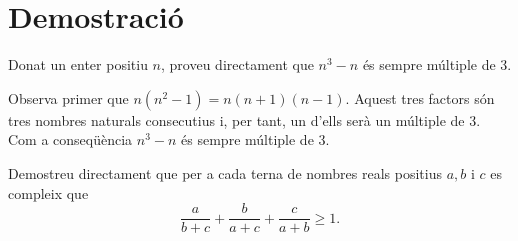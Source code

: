 \section{Demostraci\'{o}}

\begin{exer}
Donat un enter positiu $n$, proveu directament que $n^{3}-n$ \'{e}s sempre
m\'{u}ltiple de 3.
\end{exer}

\begin{solucio}
Observa primer que $n(n^{2}-1)=n(n+1)(n-1)$. Aquest tres factors s\'{o}n tres
nombres naturals consecutius i, per tant, un d'ells ser\`{a} un m\'{u}ltiple
de 3. Com a conseq\"{u}\`{e}ncia $n^{3}-n$ \'{e}s sempre m\'{u}ltiple de 3.
\end{solucio}

\begin{exer}
Demostreu directament que per a cada terna de nombres reals positius $a,b$ i
$c$ es compleix que%
\[
\frac{a}{b+c}+\frac{b}{a+c}+\frac{c}{a+b}\geq1\text{.}%
\]

\end{exer}

